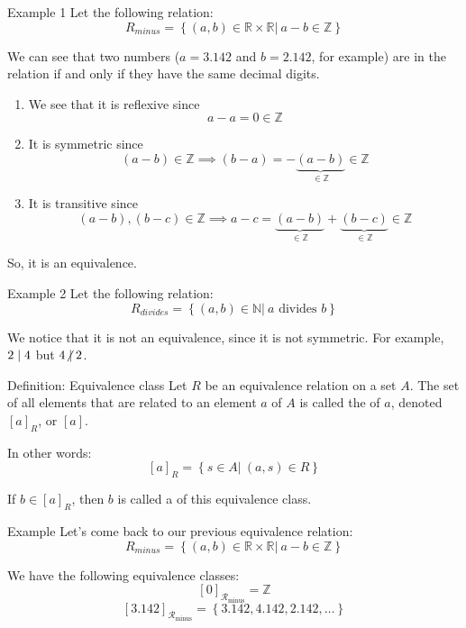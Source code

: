 \documentclass[a4paper]{article}
\begin{document}
\begin{parag}{Example 1}
    Let the following relation:
    \[R_{minus} = \left\{\left(a, b\right) \in \mathbb{R} \times \mathbb{R} |\ a - b \in \mathbb{Z}\right\}\]

    We can see that two numbers ($a = 3.142$ and $b = 2.142$, for example) are in the relation if and only if they have the same decimal digits.

    \begin{enumerate}[left=0pt]
        \item We see that it is reflexive since
            \[a - a = 0 \in \mathbb{Z}\]
        \item It is symmetric since
            \[\left(a-b\right) \in \mathbb{Z} \implies \left(b - a\right) = -\underbrace{\left(a - b\right)}_{\in \mathbb{Z}} \in \mathbb{Z}\]
        \item It is transitive since
        \[\left(a - b\right), \left(b - c\right) \in \mathbb{Z} \implies a - c = \underbrace{\left(a-b\right)}_{\in \mathbb{Z}} + \underbrace{\left(b - c\right)}_{\in \mathbb{Z}} \in \mathbb{Z}\]
    \end{enumerate}

    So, it is an equivalence.
\end{parag}

\begin{parag}{Example 2}
    Let the following relation:
    \[R_{divides} = \left\{\left(a, b\right) \in \mathbb{N} |\ a \text{ divides } b\right\}\]

    We notice that it is not an equivalence, since it is not symmetric. For example, $2 \mid 4$ but $4 \ndivides 2$.
\end{parag}

\begin{parag}{Definition: Equivalence class}
    Let $R$ be an equivalence relation on a set $A$. The set of all elements that are related to an element $a$ of $A$ is called the  of $a$, denoted $\left[a\right]_{R}$, or $\left[a\right]$.

    In other words:
    \[\left[a\right]_R = \left\{s \in A |\ \left(a, s\right) \in R\right\}\]

    If $b \in \left[a\right]_R$, then $b$ is called a  of this equivalence class.
\end{parag}

\begin{parag}{Example}
    Let's come back to our previous equivalence relation:
    \[R_{minus} = \left\{\left(a, b\right) \in \mathbb{R} \times \mathbb{R} |\ a - b \in \mathbb{Z}\right\}\]

    We have the following equivalence classes:
    \[\left[0\right]_{\mathcal{R}_{\text{minus}}} = \mathbb{Z}\]
    \[\left[3.142\right]_{\mathcal{R}_{\text{minus}}} = \left\{3.142, 4.142, 2.142, \ldots\right\}\]
\end{parag}
\end{document}
